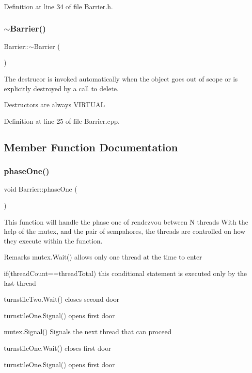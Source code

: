 Definition at line 34 of file Barrier.\+h.

\mbox{\label{class_barrier_a401f40e73302009b305904ffc7825304}} 
\subsubsection{\texorpdfstring{$\sim$\+Barrier()}{~Barrier()}}
{\footnotesize\ttfamily Barrier\+::$\sim$\+Barrier (\begin{DoxyParamCaption}{ }\end{DoxyParamCaption})\hspace{0.3cm}{\ttfamily [virtual]}}



The destrucor is invoked automatically when the object goes out of scope or is explicitly destroyed by a call to delete. 

Destructors are always V\+I\+R\+T\+U\+AL 

Definition at line 25 of file Barrier.\+cpp.



\subsection{Member Function Documentation}
\mbox{\label{class_barrier_a35c899565ad8db3425aed11daf4f09bd}} 
\subsubsection{\texorpdfstring{phase\+One()}{phaseOne()}}
{\footnotesize\ttfamily void Barrier\+::phase\+One (\begin{DoxyParamCaption}{ }\end{DoxyParamCaption})}



This function will handle the phase one of rendezvou between N threads With the help of the mutex, and the pair of sempahores, the threads are controlled on how they execute within the function. 

\begin{DoxyRemark}{Remarks}
mutex.\+Wait() allows only one thread at the time to enter

if(thread\+Count==thread\+Total) this conditional statement is executed only by the last thread

turnstile\+Two.\+Wait() closes second door

turnstile\+One.\+Signal() opens first door

mutex.\+Signal() Signals the next thread that can proceed

turnstile\+One.\+Wait() closes first door

turnstile\+One.\+Signal() opens first door 
\end{DoxyRemark}


